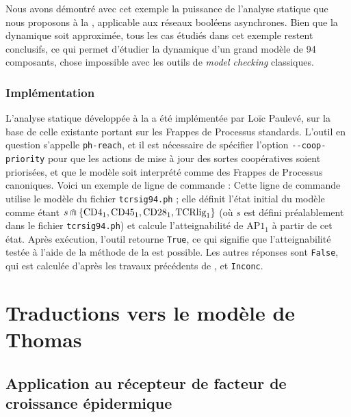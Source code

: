 \myskip

Nous avons démontré avec cet exemple la puissance de l'analyse statique que nous proposons
à la , applicable aux réseaux booléens asynchrones.
Bien que la dynamique soit approximée, tous les cas étudiés dans cet exemple restent conclusifs,
ce qui permet d'étudier la dynamique d'un grand modèle de 94 composants,
chose impossible avec les outils de \textit{model checking} classiques.

\subsubsection*{Implémentation}

L'analyse statique développée à la 
a été implémentée par Loïc Paulevé, sur la base de celle existante
portant sur les Frappes de Processus standards.
L'outil en question s'appelle \texttt{ph-reach}, et il est nécessaire de spécifier l'option
\texttt{-{}-coop-priority}
pour que les actions de mise à jour des sortes coopératives soient priorisées,
et que le modèle soit interprété comme des Frappes de Processus canoniques.
Voici un exemple de ligne de commande :
Cette ligne de commande utilise le modèle du fichier \texttt{tcrsig94.ph} ;
elle définit l'état initial du modèle comme étant
$s \Cap \{ \text{CD4}_1, \text{CD45}_1, \text{CD28}_1, \text{TCRlig}_1 \}$
(où $s$ est défini préalablement dans le fichier \texttt{tcrsig94.ph})
et calcule l'atteignabilité de $\text{AP1}_1$ à partir de cet état.
Après exécution, l'outil retourne \texttt{True}, ce qui signifie que l'atteignabilité
testée à l'aide de la méthode de la  est possible.
Les autres réponses sont \texttt{False},
qui est calculée d'après les travaux précédents de ,
et \texttt{Inconc}.



\section{Traductions vers le modèle de Thomas}


\subsection{Application au récepteur de facteur de croissance épidermique}

